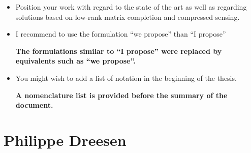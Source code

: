 \documentclass[11pt]{article}
\begin{document}
\begin{itemize}
\begin{itemize}
	\item Position your work with regard to the state of the art as well as regarding solutions based on low-rank matrix completion and compressed sensing.
	\item I recommend to use the formulation “we propose” than “I propose”
	
	{\bfseries The formulations similar to “I propose” were replaced by equivalents such as “we propose”. }
	
	\item You might wish to add a list of notation in the beginning of the thesis.
	
	{\bfseries A nomenclature list is provided before the summary of the document. }
	
	\end{itemize}
\end{itemize}

\section*{Philippe Dreesen}
\end{document}

